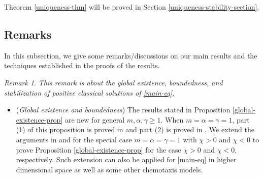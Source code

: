 \documentclass[11pt]{article} %
\theoremstyle{remark}
\newtheorem{remark}{Remark}[section]
\theoremstyle{remark}
\numberwithin{equation}{section}
\numberwithin{figure}{section}
\numberwithin{table}{section}
\begin{document}
Theorem \ref{uniqueness-thm} will be proved in Section \ref{uniqueness-stability-section}. 

\subsection{Remarks}

In this subsection, we give some remarks/discussions on our main results and the techniques established in the proofs of the results.

\begin{remark}
\label{rk1}
{\it This remark is about the global existence, boundedness, and stabilization  of positive classical solutions of \eqref{main-eq}.}

\begin{itemize}

\item[(1)] ({\it Global existence and boundedness}) 
The results stated in Proposition \ref{global-existence-prop} are new for general $m,\alpha,\gamma\ge 1$.
When $m=\alpha=\gamma=1$, part (1) of this proposition is proved in  \cite[Theorem A]{SaSh2019} and part (2) is proved in \cite[Theorem 1.4]{HaShZh2024}. 
We extend the arguments in  \cite[Theorrm 1.4]{HaShZh2024} and \cite[Theorem A]{SaSh2019} for the special case $m=\alpha=\gamma=1$ 
with $\chi>0$ and $\chi<0$ to prove Proposition \ref{global-existence-prop}  for the case $\chi>0$ and $\chi<0$, respectively. Such extension can also be applied for \eqref{main-eq} in higher dimensional space as well as some other chemotaxis models.


\end{itemize}
\end{remark}
\end{document}
